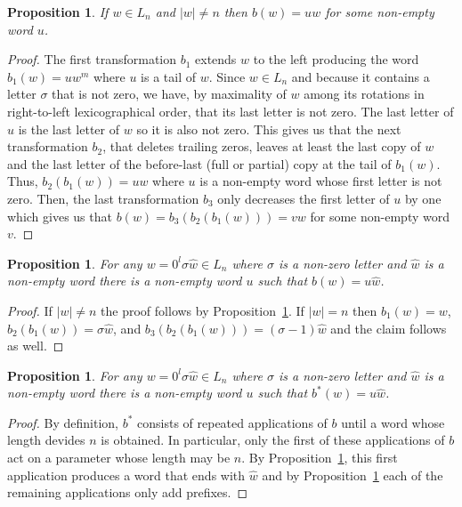\documentclass{article}
\newtheorem{proposition}[theorem]{Proposition}
\theoremstyle{definition}
\begin{document}
\begin{proposition}
	\label{w-at-the-tail}
	If $w \in L_n$ and $|w| \neq n$ then  $b(w)=uw$ for some non-empty word $u$. 
\end{proposition}
\begin{proof}
	The first transformation $b_1$ extends $w$ to the left producing the word $b_1(w)=uw^m$ where $u$ is a tail of $w$. Since $w \in L_n$ and because it contains a letter $\sigma$ that is not zero, we have, by maximality of $w$ among its rotations in right-to-left lexicographical order,  that its last letter is not zero. The last letter of $u$ is the last letter of $w$ so it is also not zero. This gives us that the next transformation $b_2$, that deletes trailing zeros, leaves at least the last copy of $w$ and the last letter of the before-last (full or partial) copy at the tail of $b_1(w)$. Thus, $b_2(b_1(w))=uw$ where $u$ is a non-empty word whose first letter is not zero. Then, the last transformation $b_3$ only decreases the first letter of $u$ by  one which gives us that $b(w)=b_3(b_2(b_1(w)))=vw$ for some non-empty word $v$.	
\end{proof}
	
\begin{proposition}
	\label{hat-w-at-the-tail}
	For any $w=0^l \sigma \hat{w}\in L_n$ where $\sigma$ is a non-zero letter and $\hat{w}$ is a non-empty word there is a non-empty word $u$ such that $b(w)=u\hat{w}$.
\end{proposition}
\begin{proof}
	If $|w|\neq n$ the proof follows by Proposition~\ref{w-at-the-tail}. If $|w|=n$ then $b_1(w)=w$, $b_2(b_1(w))=\sigma\hat{w}$, and $b_3(b_2(b_1(w)))=(\sigma-1)\hat{w}$ and the claim follows as well.
\end{proof}
	
	
\begin{proposition}
	\label{tail-is-preserved*}
	For any $w=0^l \sigma \hat{w}\in L_n$ where $\sigma$ is a non-zero letter and $\hat{w}$ is a non-empty word there is a non-empty word $u$ such that $b^*(w)=u\hat{w}$.
\end{proposition}
\begin{proof}
By definition, $b^*$ consists of repeated applications of $b$ until a word whose length devides $n$ is obtained. In particular, only the first of these applications of $b$ act on a parameter whose length may be $n$. By Proposition~\ref{hat-w-at-the-tail}, this first application produces a word that ends with $\hat{w}$ and by Proposition~\ref{w-at-the-tail} each of the remaining applications only add prefixes. 
\end{proof}
\end{document}
